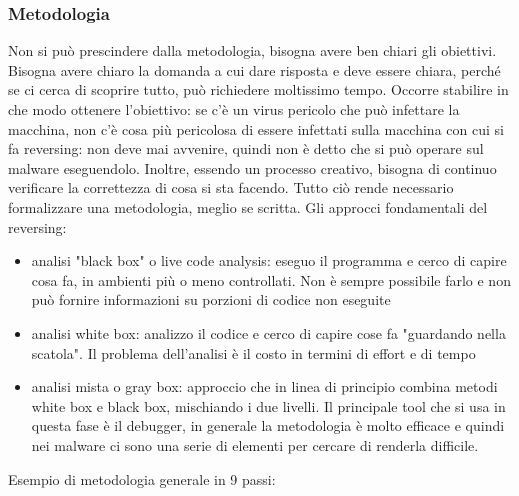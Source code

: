 \documentclass[12pt, oneside]{extbook}
\begin{document}
\subsubsection{Metodologia}
Non si può prescindere dalla metodologia, bisogna avere ben chiari gli obiettivi. Bisogna avere chiaro la domanda a cui dare risposta e deve essere chiara, perché se ci cerca di scoprire tutto, può richiedere moltissimo tempo. Occorre stabilire in che modo ottenere l'obiettivo: se c'è un virus pericolo che può infettare la macchina, non c'è cosa più pericolosa di essere infettati sulla macchina con cui si fa reversing: non deve mai avvenire, quindi non è detto che si può operare sul malware eseguendolo. Inoltre, essendo un processo creativo, bisogna di continuo verificare la correttezza di cosa si sta facendo. Tutto ciò rende necessario formalizzare una metodologia, meglio se scritta. Gli approcci fondamentali del reversing:
\begin{itemize}
\item analisi "black box" o live code analysis: eseguo il programma e cerco di capire cosa fa, in ambienti più o meno controllati. Non è sempre possibile farlo e non può fornire informazioni su porzioni di codice non eseguite
\item analisi white box: analizzo il codice e cerco di capire cose fa "guardando nella scatola". Il problema dell'analisi è il costo in termini di effort e di tempo
\item analisi mista o gray box: approccio che in linea di principio combina metodi white box e black box, mischiando i due livelli. Il principale tool che si usa in questa fase è il debugger, in generale la metodologia è molto efficace e quindi nei malware ci sono una serie di elementi per cercare di renderla difficile.
\end{itemize}
Esempio di metodologia generale in 9 passi:
\end{document}
